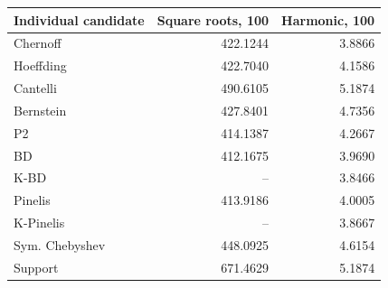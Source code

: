 \begin{tabular}{lrr}
\toprule
Individual candidate & Square roots, 100 & Harmonic, 100 \\
\midrule
Chernoff & 422.1244 & 3.8866 \\
Hoeffding & 422.7040 & 4.1586 \\
Cantelli & 490.6105 & 5.1874 \\
Bernstein & 427.8401 & 4.7356 \\
P2 & 414.1387 & 4.2667 \\
BD & 412.1675 & 3.9690 \\
K-BD & -- & 3.8466 \\
Pinelis & 413.9186 & 4.0005 \\
K-Pinelis & -- & 3.8667 \\
Sym. Chebyshev & 448.0925 & 4.6154 \\
Support & 671.4629 & 5.1874 \\
\bottomrule
\end{tabular}
